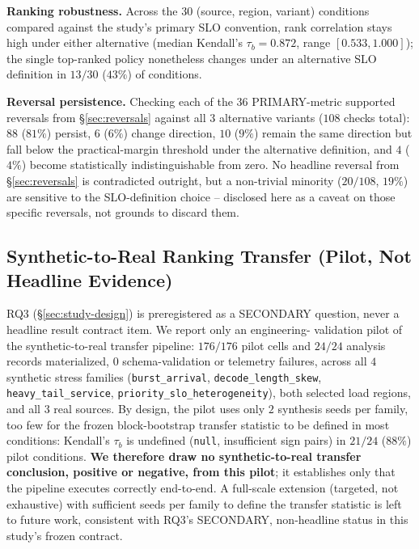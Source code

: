 \documentclass[sn-basic,Numbered,pdflatex]{sn-jnl}
\begin{document}
\textbf{Ranking robustness.} Across the $30$ (source, region, variant)
conditions compared against the study's primary SLO convention, rank
correlation stays high under either alternative (median Kendall's
$\tau_b = 0.872$, range $[0.533, 1.000]$); the single top-ranked policy
nonetheless changes under an alternative SLO definition in $13/30$ ($43\%$)
of conditions.

\textbf{Reversal persistence.} Checking each of the 36 PRIMARY-metric
supported reversals from \S\ref{sec:reversals} against all 3 alternative
variants ($108$ checks total): $88$ ($81\%$) persist, $6$ ($6\%$) change
direction, $10$ ($9\%$) remain the same direction but fall below the
practical-margin threshold under the alternative definition, and $4$
($4\%$) become statistically indistinguishable from zero. No headline
reversal from \S\ref{sec:reversals} is contradicted outright, but a
non-trivial minority ($20/108$, $19\%$) are sensitive to the SLO-definition
choice -- disclosed here as a caveat on those specific reversals, not
grounds to discard them.

\subsection{Synthetic-to-Real Ranking Transfer (Pilot, Not Headline Evidence)}
\label{sec:results-rq3-pilot}

RQ3 (\S\ref{sec:study-design}) is preregistered as a SECONDARY question,
never a headline result contract item. We report only an engineering-
validation pilot of the synthetic-to-real transfer pipeline: $176/176$
pilot cells and $24/24$ analysis records materialized, $0$ schema-validation
or telemetry failures, across all $4$ synthetic stress families
(\texttt{burst\_arrival}, \texttt{decode\_length\_skew},
\texttt{heavy\_tail\_service}, \texttt{priority\_slo\_heterogeneity}), both
selected load regions, and all $3$ real sources. By design, the pilot uses
only $2$ synthesis seeds per family, too few for the frozen block-bootstrap
transfer statistic to be defined in most conditions: Kendall's $\tau_b$ is
undefined (\texttt{null}, insufficient sign pairs) in $21/24$ ($88\%$)
pilot conditions. \textbf{We therefore draw no synthetic-to-real transfer
conclusion, positive or negative, from this pilot}; it establishes only
that the pipeline executes correctly end-to-end. A full-scale extension
(targeted, not exhaustive) with sufficient seeds per family to define the
transfer statistic is left to future work, consistent with RQ3's
SECONDARY, non-headline status in this study's frozen contract.
\end{document}
